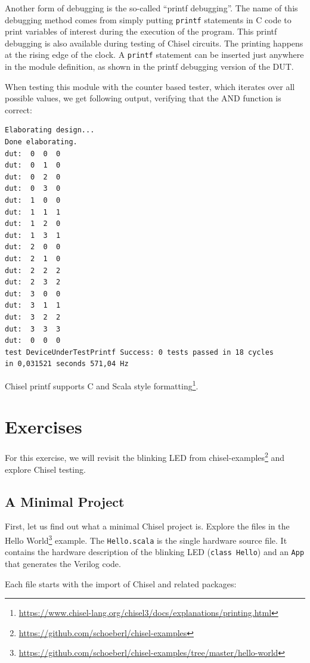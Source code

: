 \documentclass[%
    10pt,
    headinclude, footexclude,
    openright, %
    notitlepage,
    cleardoubleempty,
    headsepline,
    pointlessnumbers,
    bibtotoc, idxtotoc,
    ]{scrbook}
\newcommand{\code}[1]{{\small{\texttt{#1}}}}
\newcommand{\myref}[2]{\href{#1}{#2}}
\renewcommand{\myref}[2]{{#2}{\footnote{\url{#1}}}}
\begin{document}
Another form of debugging is the so-called ``printf debugging''. The name of this debugging method comes from
simply putting \code{printf} statements in C code to print variables of interest during
the execution of the program. This printf debugging is also available during testing
of Chisel circuits. The printing happens at the rising edge of the clock.
A \code{printf} statement can be inserted just anywhere in the module definition,
as shown in the printf debugging version of the DUT.


\noindent When testing this module with the counter based tester, which iterates over all possible
values, we get following output, verifying that the AND function is correct:

\begin{verbatim}
Elaborating design...
Done elaborating.
dut:  0  0  0
dut:  0  1  0
dut:  0  2  0
dut:  0  3  0
dut:  1  0  0
dut:  1  1  1
dut:  1  2  0
dut:  1  3  1
dut:  2  0  0
dut:  2  1  0
dut:  2  2  2
dut:  2  3  2
dut:  3  0  0
dut:  3  1  1
dut:  3  2  2
dut:  3  3  3
dut:  0  0  0
test DeviceUnderTestPrintf Success: 0 tests passed in 18 cycles
in 0,031521 seconds 571,04 Hz
\end{verbatim}

Chisel printf supports
\myref{https://www.chisel-lang.org/chisel3/docs/explanations/printing.html}{C and Scala style formatting}.


\section{Exercises}

For this exercise, we will revisit the blinking LED from
\myref{https://github.com/schoeberl/chisel-examples}{chisel-examples}
and explore Chisel testing.

\subsection{A Minimal Project}

First, let us find out what a minimal Chisel project is. Explore the files in the
\myref{https://github.com/schoeberl/chisel-examples/tree/master/hello-world}{Hello World}
example.
The \code{Hello.scala} is the single hardware source file.
It contains the hardware description of the blinking LED (\code{class Hello})
and an \code{App} that generates the Verilog code.

Each file starts with the import of Chisel and related packages:
\end{document}
